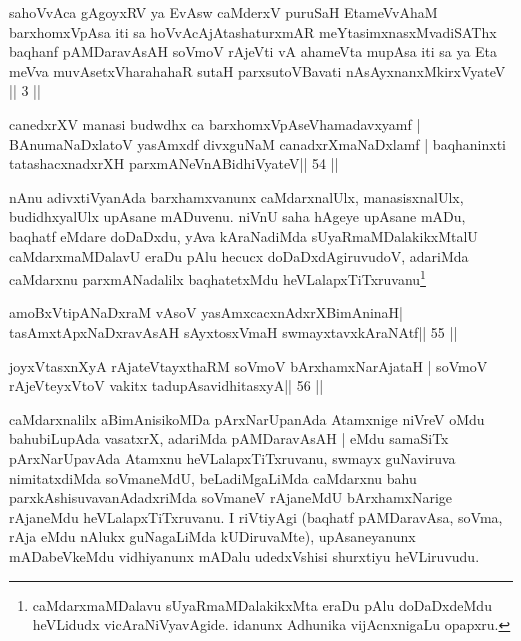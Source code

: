 

\begin{kandikeshl}
sahoVvAca gAgoyxRV ya EvAsw caMderxV puruSaH
EtameVvAhaM barxhomxVpAsa iti 
sa hoVvAcAjAtashaturxmAR meYtasimxnasxMvadiSAThx
baqhanf pAMDaravAsAH soVmoV rAjeVti
vA ahameVta mupAsa iti sa ya Eta meVva
muvAsetxV\s harahahaR sutaH parxsutoVBavati
nAsAyxnanxMkirxVyateV || 3 ||
\end{kandikeshl}


\begin{shl}
canedxrXV manasi budwdhx ca barxhomxVpAseV\s hamadavxyamf |
BAnumaNaDxlatoV yasAmxdf divxguNaM canadxrXmaNaDxlamf |
baqhaninxti tatashacxnadxrXH parxmANeVnABidhiVyateV\hfill || 54 ||
\end{shl}

\begin{artha}
nAnu adivxtiVyanAda barxhamxvanunx caMdarxnalUlx, manasisxnalUlx,  budidhxyalUlx upAsane mADuvenu. niVnU saha hAgeye upAsane mADu,  baqhatf eMdare doDaDxdu, yAva kAraNadiMda sUyaRmaMDalakikxMtalU caMdarxmaMDalavU eraDu pAlu hecucx doDaDxdAgiruvudoV, adariMda caMdarxnu parxmANadalilx baqhatetxMdu heVLalapxTiTxruvanu\footnote{caMdarxmaMDalavu sUyaRmaMDalakikxMta eraDu pAlu doDaDxdeMdu heVLidudx vicAraNiVyavAgide. idanunx Adhunika vijAcnxnigaLu opapxru.}
\end{artha}

\begin{shl}
amoBxV\s tipANaDxraM vAsoV yasAmxcacxnAdxrXBimAninaH|
tasAmxtApxNaDxravAsAH sAyxtosxVmaH swmayxtavxkAraNAtf\hfill || 55 ||
\end{shl}

\begin{shl}
joyxVtasxnXyA rAjateV\s tayxthaRM soVmoV bArxhamxNarAjataH |
soVmoV rAjeVteyxVtoV vakitx tadupAsavidhitasxyA\hfill || 56 ||
\end{shl}

\begin{artha}
caMdarxnalilx aBimAnisikoMDa pArxNarUpanAda Atamxnige niVreV oMdu  bahubiLupAda vasatxrX, adariMda pAMDaravAsAH | eMdu samaSiTx  pArxNarUpavAda Atamxnu heVLalapxTiTxruvanu, swmayx guNaviruva  nimitatxdiMda soVmaneMdU, beLadiMgaLiMda caMdarxnu bahu  parxkAshisuvavanAdadxriMda soVmaneV rAjaneMdU bArxhamxNarige rAjaneMdu heVLalapxTiTxruvanu. I riVtiyAgi (baqhatf pAMDaravAsa, soVma, rAja eMdu nAlukx guNagaLiMda kUDiruvaMte), upAsaneyanunx mADabeVkeMdu vidhiyanunx mADalu udedxVshisi shurxtiyu heVLiruvudu.
\end{artha}

